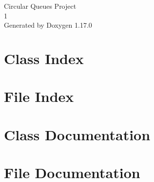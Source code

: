 \documentclass[twoside]{book}
\newcommand{\+}{\discretionary{\mbox{\scriptsize$\hookleftarrow$}}{}{}}
\newcommand{\clearemptydoublepage}{%
    \newpage{\pagestyle{empty}\cleardoublepage}%
  }
\begin{document}
  \raggedbottom
    \hypersetup{pageanchor=false,
                bookmarksnumbered=true,
                pdfencoding=unicode
               }
  \begin{titlepage}
  \vspace*{7cm}
  \begin{center}%
  {\Large Circular Queues Project}\\
  [1ex]\large 1 \\
  \vspace*{1cm}
  {\large Generated by Doxygen 1.17.0}\\
  \end{center}
  \end{titlepage}
  \clearemptydoublepage
  \tableofcontents
  \clearemptydoublepage
  \hypersetup{pageanchor=true}

\chapter{Class Index}

\chapter{File Index}

\chapter{Class Documentation}

\chapter{File Documentation}

  \backmatter
  \newpage
  \clearemptydoublepage
  \printindex
\end{document}
